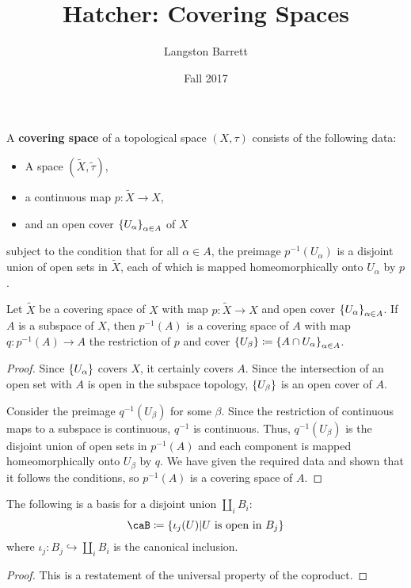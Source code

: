\documentclass[a5paper]{article}
\newcommand{\wt}{\widetilde}
\begin{document}
\title{Hatcher: Covering Spaces}
\author{Langston Barrett}
\date{Fall 2017}

\begin{definition*}
	A \textbf{covering space} of a topological space $(X,\tau)$ consists of the
  following data:
  \begin{itemize}
    \itemsep0em
    \item A space $(\widetilde{X},\widetilde{\tau})$,
    \item a continuous map $p:\widetilde{X}\to X$,
    \item and an open cover $\left\{U_\alpha\right\}_{\alpha\in A}$ of $X$
  \end{itemize}
  subject to the condition that for all $\alpha\in A$, the preimage
  $p^{-1}(U_\alpha)$ is a disjoint union of open sets in $\widetilde{X}$, each of
  which is mapped homeomorphically onto $U_\alpha$ by $p$.
\end{definition*}
\begin{proposition*}
	Let $\wt{X}$ be a covering space of $X$ with map $p:\widetilde{X}\to X$ and
  open cover $\left\{U_\alpha\right\}_{\alpha\in A}$. If $A$ is a subspace of $X$, then
  $p^{-1}(A)$ is a covering space of $A$ with map $q:p^{-1}(A)\to A$
  the restriction of $p$ and cover
  $\left\{U_\beta\right\}\coloneqq \left\{A\cap U_\alpha\right\}_{\alpha\in A}$.
\end{proposition*}
\begin{proof}
  Since $\left\{U_\alpha\right\}$ covers $X$, it certainly covers $A$. Since the
  intersection of an open set with $A$ is open in the subspace topology,
  $\left\{U_\beta\right\}$ is an open cover of $A$.

  Consider the preimage $q^{-1}(U_\beta)$ for some $\beta$.
  Since the restriction of continuous maps to a subspace is continuous,
  $q^{-1}$ is continuous. Thus, $q^{-1}(U_\beta)$ is the disjoint union of open
  sets in $p^{-1}(A)$ and each component is mapped homeomorphically onto
  $U_\beta$ by $q$. We have given the required data and shown that it follows
  the conditions, so $p^{-1}(A)$ is a covering space of $A$.
\end{proof}


\begin{lemma*}
  The following is a basis for a disjoint union $\coprod_i B_i$:
  \begin{equation*}
    \caB \coloneqq \braces{\iota_j(U)|U\text{ is open in }B_j}
  \end{equation*}
  where $\iota_j:B_j\hookrightarrow \coprod_i B_i$ is the canonical inclusion.
\end{lemma*}
\begin{proof}
	This is a restatement of the universal property of the coproduct.
\end{proof}
\end{document}
